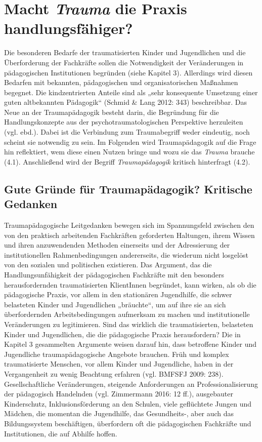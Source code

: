 \section{Macht \textit{Trauma} die Praxis handlungsfähiger?}
Die besonderen Bedarfe der traumatisierten Kinder und Jugendlichen und die Überforderung der Fachkräfte sollen die Notwendigkeit der Veränderungen in pädagogischen Institutionen begründen (siehe Kapitel 3). Allerdings wird diesen Bedarfen mit bekannten, pädagogischen und organisatorischen Maßnahmen begegnet. Die kindzentrierten Anteile sind als „sehr konsequente Umsetzung einer guten altbekannten Pädagogik“ (Schmid \& Lang 2012: 343) beschreibbar. Das Neue an der Traumapädagogik besteht darin, die Begründung für die Handlungskonzepte aus der psychotraumatologischen Perspektive herzuleiten (vgl. ebd.). Dabei ist die Verbindung zum Traumabegriff weder eindeutig, noch scheint sie notwendig zu sein. Im Folgenden wird Traumapädagogik auf die Frage hin reflektiert, wem diese einen Nutzen bringe und wozu sie das \textit{Trauma} brauche (4.1). Anschließend wird der Begriff \textit{Traumapädagogik} kritisch hinterfragt (4.2).

\subsection{Gute Gründe für Traumapädagogik? Kritische Gedanken}
Traumapädagogische Leitgedanken bewegen sich im Spannungsfeld zwischen den von den praktisch arbeitenden Fachkräften geforderten Haltungen, ihrem Wissen und ihren anzuwendenden Methoden einerseits und der Adressierung der institutionellen Rahmenbedingungen andererseits, die wiederum nicht losgelöst von den sozialen und politischen existieren. Das Argument, das die Handlungsunfähigkeit der pädagogischen Fachkräfte mit den besonders herausfordernden traumatisierten KlientInnen begründet, kann wirken, als ob die pädagogische Praxis, vor allem in den stationären Jugendhilfe, die schwer belasteten Kinder und Jugendlichen „bräuchte“, um auf ihre sie an sich überfordernden Arbeitsbedingungen aufmerksam zu machen und institutionelle Veränderungen zu legitimieren. Sind das wirklich die traumatisierten, belasteten Kinder und Jugendlichen, die die pädagogische Praxis herausfordern? Die in Kapitel 3 gesammelten Argumente weisen darauf hin, dass betroffene Kinder und Jugendliche traumapädagogische Angebote brauchen. Früh und komplex traumatisierte Menschen, vor allem Kinder und Jugendliche, haben in der Vergangenheit zu wenig Beachtung erfahren (vgl. BMFSFJ 2009: 238). Gesellschaftliche Veränderungen, steigende Anforderungen an Professionalisierung der pädagogisch Handelnden (vgl. Zimmermann 2016: 12 ff.), ausgebauter Kinderschutz, Inklusionsförderung an den Schulen, viele geflüchtete Jungen und Mädchen, die momentan die Jugendhilfe, das Gesundheits-, aber auch das Bildungssystem beschäftigen, überfordern oft die pädagogischen Fachkräfte und Institutionen, die auf Abhilfe hoffen.

